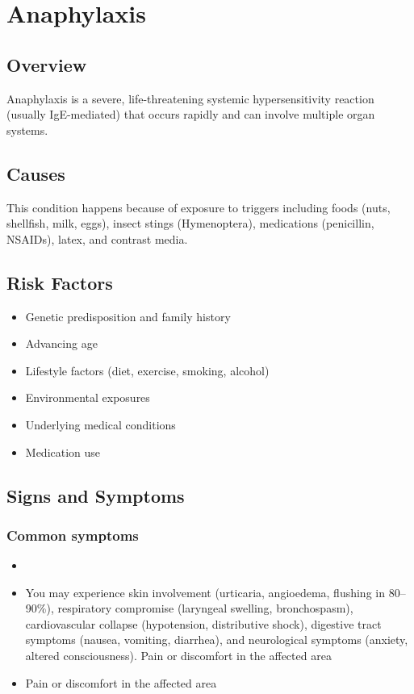 \chapter{Anaphylaxis}
\label{sec:Anaphylaxis}

\section{Overview}
Anaphylaxis is a severe, life-threatening systemic hypersensitivity reaction (usually IgE-mediated) that occurs rapidly and can involve multiple organ systems.
\section{Causes}
This condition happens because of exposure to triggers including foods (nuts, shellfish, milk, eggs), insect stings (Hymenoptera), medications (penicillin, NSAIDs), latex, and contrast media.     
\section{Risk Factors}

\begin{itemize}[noitemsep]
  \item Genetic predisposition and family history
  \item Advancing age
  \item Lifestyle factors (diet, exercise, smoking, alcohol)
  \item Environmental exposures
  \item Underlying medical conditions
  \item Medication use
\end{itemize}
\section{Signs and Symptoms}

\subsection{Common symptoms}
\begin{itemize}[noitemsep]
  \item \item You may experience skin involvement (urticaria, angioedema, flushing in 80--90\%), respiratory compromise (laryngeal swelling, bronchospasm), cardiovascular collapse (hypotension, distributive shock), digestive tract symptoms (nausea, vomiting, diarrhea), and neurological symptoms (anxiety, altered consciousness). Pain or discomfort in the affected area    \item Pain or discomfort in the affected area
  \end{itemize}

